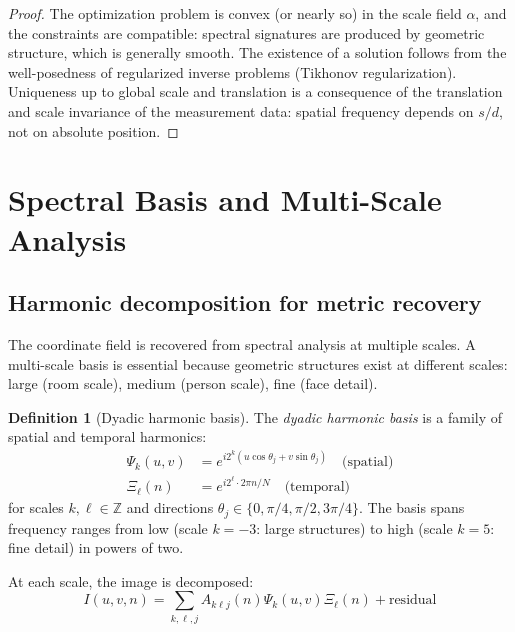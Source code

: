 \documentclass[11pt,twocolumn,a4paper]{article}
\theoremstyle{definition}
\newtheorem{definition}[theorem]{Definition}
\begin{document}
\begin{proof}
The optimization problem is convex (or nearly so) in the scale field $\alpha$, and the constraints are compatible: spectral signatures are produced by geometric structure, which is generally smooth. The existence of a solution follows from the well-posedness of regularized inverse problems (Tikhonov regularization). Uniqueness up to global scale and translation is a consequence of the translation and scale invariance of the measurement data: spatial frequency depends on $s/d$, not on absolute position.
\end{proof}

\section{Spectral Basis and Multi-Scale Analysis}
\label{sec:basis}

\subsection{Harmonic decomposition for metric recovery}

The coordinate field is recovered from spectral analysis at multiple scales. A multi-scale basis is essential because geometric structures exist at different scales: large (room scale), medium (person scale), fine (face detail).

\begin{definition}[Dyadic harmonic basis]
\label{def:dyadic}
The \emph{dyadic harmonic basis} is a family of spatial and temporal harmonics:
\begin{align}
\Psi_k(u, v) &= e^{i 2^k (u \cos\theta_j + v \sin\theta_j)} \quad \text{(spatial)} \\
\Xi_\ell(n) &= e^{i 2^\ell \cdot 2\pi n / N} \quad \text{(temporal)}
\end{align}
for scales $k, \ell \in \mathbb{Z}$ and directions $\theta_j \in \{0, \pi/4, \pi/2, 3\pi/4\}$. The basis spans frequency ranges from low (scale $k=-3$: large structures) to high (scale $k=5$: fine detail) in powers of two.
\end{definition}

At each scale, the image is decomposed:
\begin{equation}
I(u,v,n) = \sum_{k,\ell,j} A_{k\ell j}(n) \Psi_k(u,v) \Xi_\ell(n) + \text{residual}
\end{equation}
\end{document}
